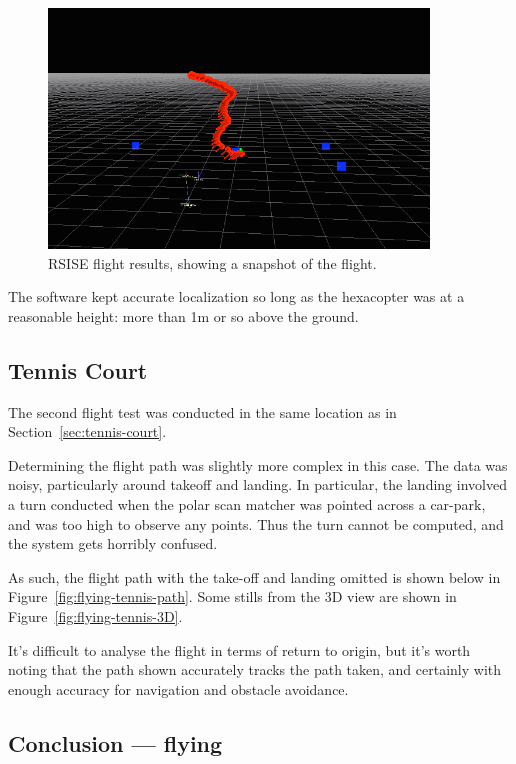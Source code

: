\documentclass[12pt,oneside,a4paper]{book}
\begin{document}
\begin{figure}
  \centering
  \includegraphics[width=0.9\textwidth]{figs/rsise-flying-results}
  \caption{RSISE flight results, showing a snapshot of the
    flight. }
  \label{fig:rsise-results}
\end{figure}

The software kept accurate localization so long as the hexacopter was
at a reasonable height: more than 1m or so above the ground.

\subsection{Tennis Court}
\label{sec:tennis-court-1}

The second flight test was conducted in the same location as in
Section~\ref{sec:tennis-court}. 

Determining the flight path was slightly more complex in this
case. The data was noisy, particularly around takeoff and landing. In
particular, the landing involved a turn conducted when the polar scan
matcher was pointed across a car-park, and was too high to observe any
points. Thus the turn cannot be computed, and the system gets horribly
confused.

As such, the flight path with the take-off and landing omitted is
shown below in Figure~\ref{fig:flying-tennis-path}. Some stills from
the 3D view are shown in Figure~\ref{fig:flying-tennis-3D}.



It's difficult to analyse the flight in terms of return to origin, but
it's worth noting that the path shown accurately tracks the path
taken, and certainly with enough accuracy for navigation and obstacle
avoidance.

\subsection{Conclusion --- flying}
\label{sec:conclusion-flying}
\end{document}
